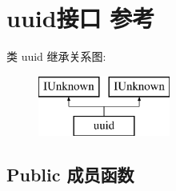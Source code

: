 \hypertarget{interfaceuuid}{}\section{uuid接口 参考}
\label{interfaceuuid}
类 uuid 继承关系图\+:\begin{figure}[H]
\begin{center}
\leavevmode
\includegraphics[height=2.000000cm]{interfaceuuid}
\end{center}
\end{figure}
\subsection*{Public 成员函数}

